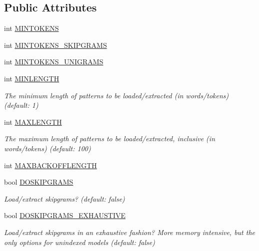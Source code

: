 \subsection*{Public Attributes}
\begin{DoxyCompactItemize}
\item 
int \hyperlink{classPatternModelOptions_a4572cfbca28c3130d98f886a4c1857e0}{M\+I\+N\+T\+O\+K\+E\+N\+S}
\item 
int \hyperlink{classPatternModelOptions_a130b2214a2a9eaaa4862f8019fdfe2bc}{M\+I\+N\+T\+O\+K\+E\+N\+S\+\_\+\+S\+K\+I\+P\+G\+R\+A\+M\+S}
\item 
int \hyperlink{classPatternModelOptions_a14d2ed1c3edb2c9b3944aff462e87a03}{M\+I\+N\+T\+O\+K\+E\+N\+S\+\_\+\+U\+N\+I\+G\+R\+A\+M\+S}
\item 
int \hyperlink{classPatternModelOptions_a4dada20f1bba3cc5e08a49e4a9bfb545}{M\+I\+N\+L\+E\+N\+G\+T\+H}
\begin{DoxyCompactList}\small\item\em The minimum length of patterns to be loaded/extracted (in words/tokens) (default\+: 1) \end{DoxyCompactList}\item 
int \hyperlink{classPatternModelOptions_a7630da974c460ec2d67c2ed9f4c84144}{M\+A\+X\+L\+E\+N\+G\+T\+H}
\begin{DoxyCompactList}\small\item\em The maximum length of patterns to be loaded/extracted, inclusive (in words/tokens) (default\+: 100) \end{DoxyCompactList}\item 
int \hyperlink{classPatternModelOptions_a9154b55890ee1ff5d9ec43741a0e3908}{M\+A\+X\+B\+A\+C\+K\+O\+F\+F\+L\+E\+N\+G\+T\+H}
\item 
bool \hyperlink{classPatternModelOptions_a79465fd9abbfab5a481222d9660e598a}{D\+O\+S\+K\+I\+P\+G\+R\+A\+M\+S}
\begin{DoxyCompactList}\small\item\em Load/extract skipgrams? (default\+: false) \end{DoxyCompactList}\item 
bool \hyperlink{classPatternModelOptions_ab9f8da4d9fe653cf967f571ae6766ed4}{D\+O\+S\+K\+I\+P\+G\+R\+A\+M\+S\+\_\+\+E\+X\+H\+A\+U\+S\+T\+I\+V\+E}
\begin{DoxyCompactList}\small\item\em Load/extract skipgrams in an exhaustive fashion? More memory intensive, but the only options for unindexed models (default\+: false) \end{DoxyCompactList}\item 

\end{DoxyCompactItemize}
